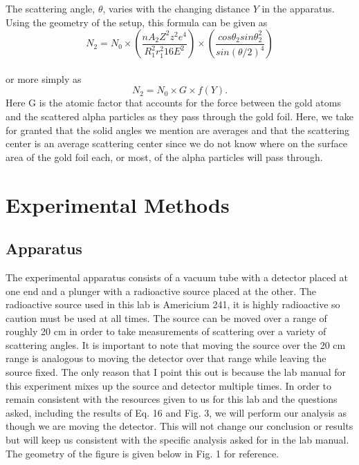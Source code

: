 The scattering angle, $\theta$, varies with the changing distance $Y$ in the apparatus. Using the geometry of the setup, this formula can be given as
\begin{equation} \label{complicated}N_2=N_0\times \left( \frac{nA_2Z^2z^2e^4}{R_1^2r_1^2 16 E^2}\right)\times \left(\frac{cos\theta_2 sin\theta_2^2}{sin(\theta/2)^4}\right) \end {equation}\\or more simply as\begin{equation}  \label{simple}N_2=N_0\times G\times f(Y). \end{equation} Here G is the atomic factor that accounts for the force between the gold atoms and the scattered alpha particles as they pass through the gold foil. Here, we take for granted that the solid angles we mention are averages and that the scattering center is an average scattering center since we do not know where on the surface area of the gold foil each, or most, of the alpha particles will pass through. 
\section{Experimental Methods}
\subsection{Apparatus}
\indent \indent The experimental apparatus consists of a vacuum tube with a detector placed at one end and a plunger with a radioactive source placed at the other. The radioactive source used in this lab is Americium 241, it is highly radioactive so caution must be used at all times. The source can be moved over a range of roughly 20 cm in order to take measurements of scattering over a variety of scattering angles. It is important to note that moving the source over the 20 cm range is analogous to moving the detector over that range while leaving the source fixed.  The only reason that I point this out is because the lab manual for this experiment mixes up the source and detector multiple times.  In order to remain consistent with the resources given to us for this lab and the questions asked, including the results of Eq. 16 and Fig. 3, we will perform our analysis as though we are moving the detector.  This will not change our conclusion or results but will keep us consistent with the specific analysis asked for in the lab manual. The geometry of the figure is given below in Fig. 1 for reference.
 
